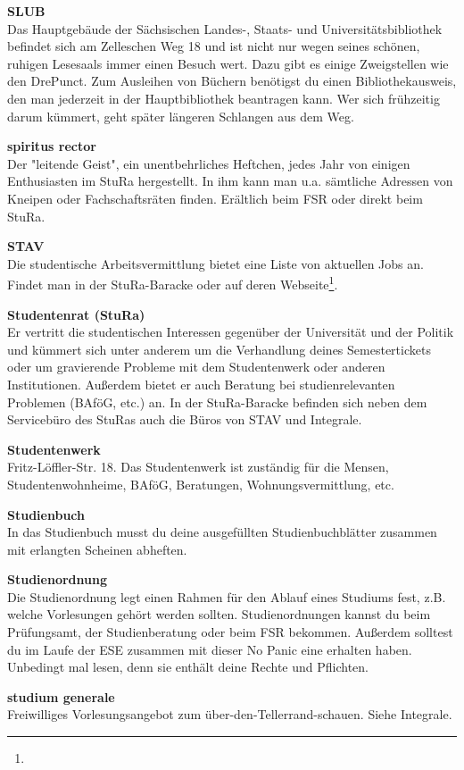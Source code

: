 \textbf{SLUB} \\
Das Hauptgebäude der Sächsischen Landes-, Staats- und Universitätsbibliothek befindet sich am Zelleschen Weg 18 und ist nicht nur wegen seines schönen, ruhigen Lesesaals immer einen Besuch wert.
Dazu gibt es einige Zweigstellen wie den DrePunct.
Zum Ausleihen von Büchern benötigst du einen Bibliothekausweis, den man jederzeit in der Hauptbibliothek beantragen kann.
Wer sich frühzeitig darum kümmert, geht später längeren Schlangen aus dem Weg.

\textbf{spiritus rector} \\
Der "leitende Geist", ein unentbehrliches Heftchen, jedes Jahr von einigen Enthusiasten im StuRa hergestellt.
In ihm kann man u.a. sämtliche Adressen von Kneipen oder Fachschaftsräten finden.
Erältlich beim FSR oder direkt beim StuRa.

\textbf{STAV} \\
Die studentische Arbeitsvermittlung bietet eine Liste von aktuellen Jobs an.
Findet man in der StuRa-Baracke oder auf deren Webseite\footnote{}.

\textbf{Studentenrat (StuRa)} \\
Er vertritt die studentischen Interessen gegenüber der Universität und der Politik und kümmert sich unter anderem um die Verhandlung deines Semestertickets oder um gravierende Probleme mit dem Studentenwerk oder anderen Institutionen.
Außerdem bietet er auch Beratung bei studienrelevanten Problemen (BAföG, etc.) an.
In der StuRa-Baracke befinden sich neben dem Servicebüro des StuRas auch die Büros von STAV und Integrale.

\textbf{Studentenwerk} \\
Fritz-Löffler-Str. 18.
Das Studentenwerk ist zuständig für die Mensen, Studentenwohnheime, BAföG, Beratungen, Wohnungsvermittlung, etc.

\textbf{Studienbuch} \\
In das Studienbuch musst du deine ausgefüllten Studienbuchblätter zusammen mit erlangten Scheinen abheften.

\textbf{Studienordnung} \\
Die Studienordnung legt einen Rahmen für den Ablauf eines Studiums fest, z.B. welche Vorlesungen gehört werden sollten.
Studienordnungen kannst du beim Prüfungsamt, der Studienberatung oder beim FSR bekommen.
Außerdem solltest du im Laufe der ESE zusammen mit dieser No Panic eine erhalten haben.
Unbedingt mal lesen, denn sie enthält deine Rechte und Pflichten.

\textbf{studium generale} \\
Freiwilliges Vorlesungsangebot zum über-den-Tellerrand-schauen.
Siehe Integrale.

